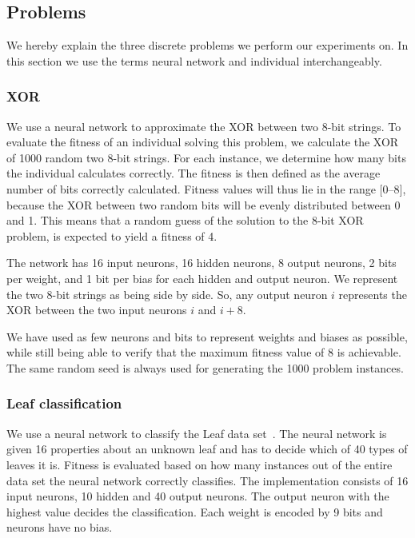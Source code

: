 \subsection{Problems}
\label{sec:problems}
We hereby explain the three discrete problems we perform our experiments on. In this section we use the terms neural network and individual interchangeably.

\subsubsection{XOR}
We use a neural network to approximate the XOR between two 8-bit strings.
To evaluate the fitness of an individual solving this problem, we calculate the XOR of \num{1000} random two 8-bit strings.
For each instance, we determine how many bits the individual calculates correctly.
The fitness is then defined as the average number of bits correctly calculated.
Fitness values will thus lie in the range $[0$--$8]$, because the XOR between two random bits will be evenly distributed between 0 and 1. This means that a random guess of the solution to the 8-bit XOR problem, is expected to yield a fitness of 4.

The network has 16 input neurons, 16 hidden neurons, 8 output neurons, 2 bits per weight, and 1 bit per bias for each hidden and output neuron. We represent the two 8-bit strings as being side by side. So, any output neuron $i$ represents the XOR between the two input neurons $i$ and $i+8$. 

We have used as few neurons and bits to represent weights and biases as possible, while still being able to verify that the maximum fitness value of 8 is achievable.
The same random seed is always used for generating the 1000 problem instances.

\subsubsection{Leaf classification}
We use a neural network to classify the Leaf data set~\cite{Bache+Lichman:2013, leafdataset}.
The neural network is given 16 properties about an unknown leaf and has to decide which of 40 types of leaves it is.
Fitness is evaluated based on how many instances out of the entire data set the neural network correctly classifies.
The implementation consists of 16 input neurons, 10 hidden and 40 output neurons. The output neuron with the highest value decides the classification. Each weight is encoded by 9 bits and neurons have no bias.

